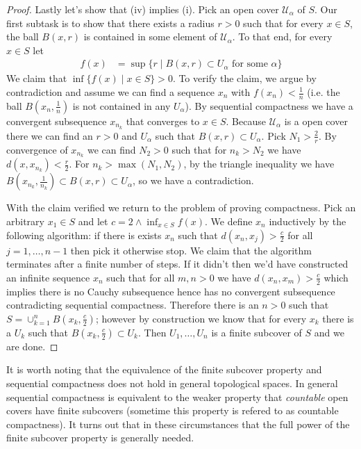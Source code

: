 \begin{proof}
Lastly let's show that (iv) implies (i).  Pick an open cover
$\mathcal{U}_\alpha$ of $S$.  Our first subtask is to show that there exists a
radius $r > 0$ such that for every $x \in S$, the ball $B(x,r)$ is contained in some
element of $\mathcal{U}_\alpha$.   To that end, for every $x \in S$ let 
\begin{align*}
f(x) &= \sup \lbrace r \mid B(x,r) \subset U_\alpha \text{ for some }
\alpha \rbrace
\end{align*}
We claim that $\inf \lbrace f(x) \mid x \in S \rbrace > 0$.  To verify
the claim, we argue by contradiction and assume we can find a sequence
$x_n$ with $f(x_n) < \frac{1}{n}$ (i.e. the ball $B(x_n, \frac{1}{n})$
is not contained in any $U_\alpha$). 
By sequential compactness we have a convergent subsequence $x_{n_k}$
that converges to $x \in S$.  Because $\mathcal{U}_\alpha$ is a open cover there we
can find an $r > 0$ and $U_\alpha$ such that $B(x, r) \subset
U_\alpha$.  Pick $N_1 > \frac{2}{r}$.  By convergence of $x_{n_k}$ we can find $N_2 > 0$ such that
for $n_k > N_2$ we have $d(x, x_{n_k}) < \frac{r}{2}$.  For $n_k >
\max(N_1, N_2)$, by the triangle inequality we have $B(x_{n_k},
\frac{1}{n_k}) \subset B(x,r) \subset U_\alpha$, so we have
a contradiction.

With the claim verified we return to the problem of proving
compactness.  Pick an arbitrary $x_1 \in S$ and let $c = 2 \wedge
\inf_{x \in S} f(x)$.  We define $x_n$ inductively by the following
algorithm: if there is exists $x_n$ such that $d(x_n, x_j) >
\frac{c}{2}$ for all $j=1, \dots, n-1$ then pick it otherwise stop.
We claim that the algorithm terminates after a finite number of
steps.  If it didn't then we'd have constructed an infinite sequence
$x_n$ such that for all $m,n > 0$ we have $d(x_n,x_m) > \frac{c}{2}$
which implies there is no Cauchy subsequence hence has no convergent
subsequence contradicting sequential compactness.  Therefore there is an $n>0$ such that $S = \cup_{k=1}^n
B(x_k, \frac{c}{2})$; however by construction we know that for every
$x_k$ there is a $U_k$ such that $B(x_k, \frac{c}{2}) \subset U_k$.
Then $U_1, \dots, U_n$ is a finite subcover of $S$ and we are done.
\end{proof}
It is worth noting that the equivalence of the finite subcover
property and sequential compactness does not hold in general
topological spaces.  In general sequential compactness is equivalent
to the weaker property that \emph{countable} open covers have finite
subcovers (sometime this property is refered to as countable
compactness).  It turns out that in these circumstances that the full
power of the finite subcover property is generally needed.

